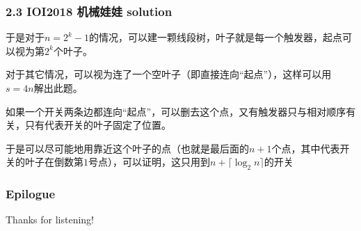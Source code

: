\documentclass[10pt]{beamer}
\begin{document}
\clearpage
\begin{frame}
	\frametitle{2.3 IOI2018 机械娃娃 solution}

	于是对于$n=2^k-1$的情况，可以建一颗线段树，叶子就是每一个触发器，起点可以视为第$2^k$个叶子。

	对于其它情况，可以视为连了一个空叶子（即直接连向“起点”），这样可以用$s=4n$解出此题。

	如果一个开关两条边都连向“起点”，可以删去这个点，又有触发器只与相对顺序有关，只有代表开关的叶子固定了位置。
	
	于是可以尽可能地用靠近这个叶子的点（也就是最后面的$n+1$个点，其中代表开关的叶子在倒数第$1$号点），可以证明，这只用到$n+\lceil\log_2n\rceil$的开关

\end{frame}
\clearpage
\begin{frame}
	\frametitle{Epilogue}

	\begin{center}
		\Huge Thanks for listening!
	\end{center}

\end{frame}
\end{document}
